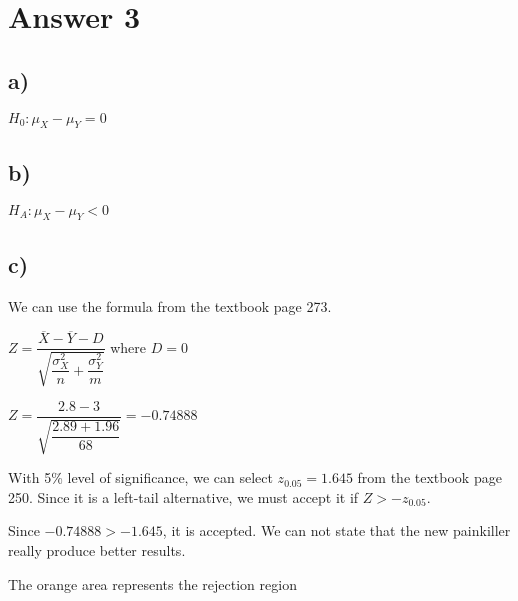 \documentclass[12pt]{article}
\begin{document}
\section*{Answer 3}

\subsection*{a)}
    \begin{center}
        $H_0: \mu_X - \mu_Y = 0$
    \end{center}
   

\subsection*{b)}
    \begin{center}
        $H_A: \mu_X - \mu_Y < 0$
    \end{center}

    
\subsection*{c)}
    We can use the formula from the textbook page 273.
    
    \begin{center}
        $Z = \dfrac{\overline{X} - \overline{Y} - D}{\sqrt{\dfrac{\sigma_X^2}{n} + \dfrac{\sigma_Y^2}{m}}}$ where $D = 0$
    \end{center}
    
    \begin{center}
        $Z = \dfrac{2.8 - 3}{\sqrt{\dfrac{2.89 + 1.96}{68}}} = -0.74888$
    \end{center}
    
    With 5\% level of significance, we can select $z_{0.05} = 1.645$ from the textbook page 250. Since it is a left-tail alternative, we must accept it if $Z > -z_{0.05}$.
    
    Since $-0.74888 > -1.645$, it is accepted. We can not state that the new painkiller really produce better results.
  
    \begin{center}
    \end{center}
    
    \begin{center}
        The orange area represents the rejection region
    \end{center}
    
\end{document}
